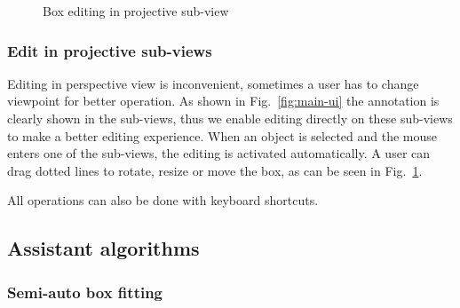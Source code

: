 \documentclass[letterpaper, 10 pt, conference]{ieeeconf}  %
\begin{document}
\begin{figure}[t]
	\centering
	\caption{Box editing in projective sub-view}
	\label{fig:box-mouse-edit-subview}
\end{figure}

\subsubsection{Edit in projective sub-views}
Editing in perspective view is inconvenient, sometimes a user has to change viewpoint for better operation. As shown in Fig.~\ref{fig:main-ui} the annotation is clearly shown in the sub-views, thus we enable editing directly on these sub-views to make a better editing experience. When an object is selected and the mouse enters one of the sub-views, the editing is activated automatically. A user can drag dotted lines to rotate, resize or move the box, as can be seen in Fig.~\ref{fig:box-mouse-edit-subview}.

All operations can also be done with keyboard shortcuts.



\subsection{Assistant algorithms}


\subsubsection{Semi-auto box fitting}
\end{document}
